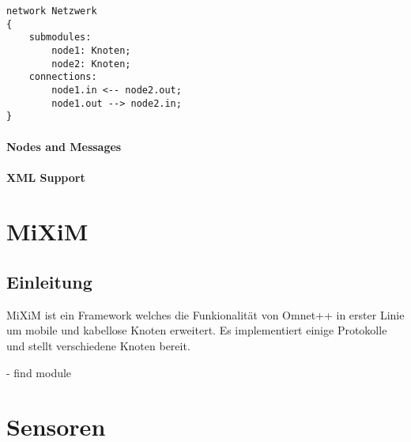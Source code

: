 \begin{minipage}{\textwidth}
\begin{lstlisting}[language=ned]
network Netzwerk
{
	submodules:
		node1: Knoten;
		node2: Knoten;
	connections:
		node1.in <-- node2.out;
		node1.out --> node2.in;
}
\end{lstlisting}
\end{minipage}

\paragraph{Nodes and Messages}

\paragraph{XML Support}

\section{MiXiM}

\subsection{Einleitung}

MiXiM\cite{mixim} ist ein Framework welches die Funkionalität von Omnet++ in erster Linie um mobile und kabellose Knoten erweitert. Es implementiert einige Protokolle und stellt verschiedene Knoten bereit.

- find module

\section{Sensoren}
